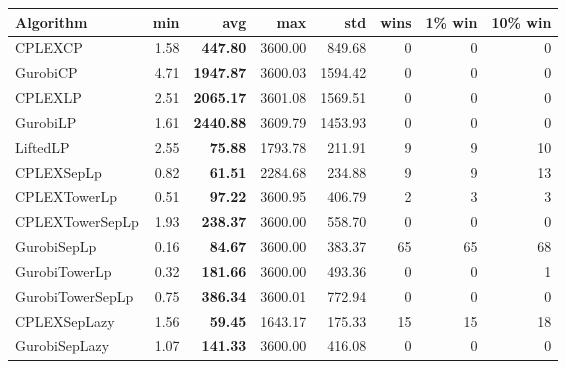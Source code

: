 \begin{tabular}{lrrrrrrr}
Algorithm & min & avg & max & std
& wins & 1\% win & 10\% win 
\\
\hline
CPLEXCP&1.58& \bf447.80& 3600.00& 849.68&0&0&0\\
GurobiCP&4.71& \bf1947.87& 3600.03& 1594.42&0&0&0\\
CPLEXLP&2.51& \bf2065.17& 3601.08& 1569.51&0&0&0\\
GurobiLP&1.61& \bf2440.88& 3609.79& 1453.93&0&0&0\\
LiftedLP&2.55& \bf75.88& 1793.78& 211.91&9&9&10\\
CPLEXSepLp&0.82& \bf61.51& 2284.68& 234.88&9&9&13\\
CPLEXTowerLp&0.51& \bf97.22& 3600.95& 406.79&2&3&3\\
CPLEXTowerSepLp&1.93& \bf238.37& 3600.00& 558.70&0&0&0\\
GurobiSepLp&0.16& \bf84.67& 3600.00& 383.37&65&65&68\\
GurobiTowerLp&0.32& \bf181.66& 3600.00& 493.36&0&0&1\\
GurobiTowerSepLp&0.75& \bf386.34& 3600.01& 772.94&0&0&0\\
CPLEXSepLazy&1.56& \bf59.45& 1643.17& 175.33&15&15&18\\
GurobiSepLazy&1.07& \bf141.33& 3600.00& 416.08&0&0&0
\end{tabular}

